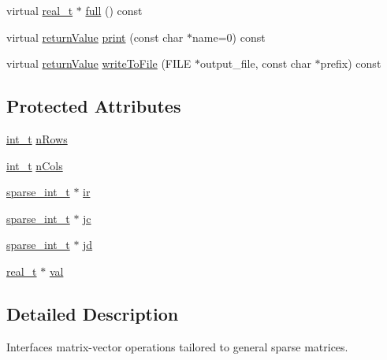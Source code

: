 \begin{DoxyCompactItemize}
\item 
virtual \hyperlink{qp_o_a_s_e_s__wrapper_8h_a0d00e2b3dfadee81331bbb39068570c4}{real\+\_\+t} $\ast$ \hyperlink{class_sparse_matrix_a9ade370eadd43330336498cde4c3b3a7}{full} () const
\item 
virtual \hyperlink{_message_handling_8hpp_a81d556f613bfbabd0b1f9488c0fa865e}{return\+Value} \hyperlink{class_sparse_matrix_aa27acfde647c2648d1b8e71a0a53c39e}{print} (const char $\ast$name=0) const
\item 
virtual \hyperlink{_message_handling_8hpp_a81d556f613bfbabd0b1f9488c0fa865e}{return\+Value} \hyperlink{class_sparse_matrix_a90325a9e3d620f8f8b8201a7111d2aae}{write\+To\+File} (F\+I\+LE $\ast$output\+\_\+file, const char $\ast$prefix) const
\end{DoxyCompactItemize}
\subsection*{Protected Attributes}
\begin{DoxyCompactItemize}
\item 
\hyperlink{_types_8hpp_ab6fd6105e64ed14a0c9281326f05e623}{int\+\_\+t} \hyperlink{class_sparse_matrix_abef34a6737a6253676e85ea7350e882b}{n\+Rows}
\item 
\hyperlink{_types_8hpp_ab6fd6105e64ed14a0c9281326f05e623}{int\+\_\+t} \hyperlink{class_sparse_matrix_a5cdff014cc202f3c6c906fa8b8a4317a}{n\+Cols}
\item 
\hyperlink{_types_8hpp_aa5432b00c9081e2d62d7f38c32e4ed80}{sparse\+\_\+int\+\_\+t} $\ast$ \hyperlink{class_sparse_matrix_a31cffc07bca675d7feb34cac91cd378b}{ir}
\item 
\hyperlink{_types_8hpp_aa5432b00c9081e2d62d7f38c32e4ed80}{sparse\+\_\+int\+\_\+t} $\ast$ \hyperlink{class_sparse_matrix_af03f3af2ef00771022a26d5b86e40399}{jc}
\item 
\hyperlink{_types_8hpp_aa5432b00c9081e2d62d7f38c32e4ed80}{sparse\+\_\+int\+\_\+t} $\ast$ \hyperlink{class_sparse_matrix_a25c7628d9d0944161c25566900b49631}{jd}
\item 
\hyperlink{qp_o_a_s_e_s__wrapper_8h_a0d00e2b3dfadee81331bbb39068570c4}{real\+\_\+t} $\ast$ \hyperlink{class_sparse_matrix_aa8f38b3ba839a4b3e7d04fb66d4fca7b}{val}
\end{DoxyCompactItemize}


\subsection{Detailed Description}
Interfaces matrix-\/vector operations tailored to general sparse matrices. 

